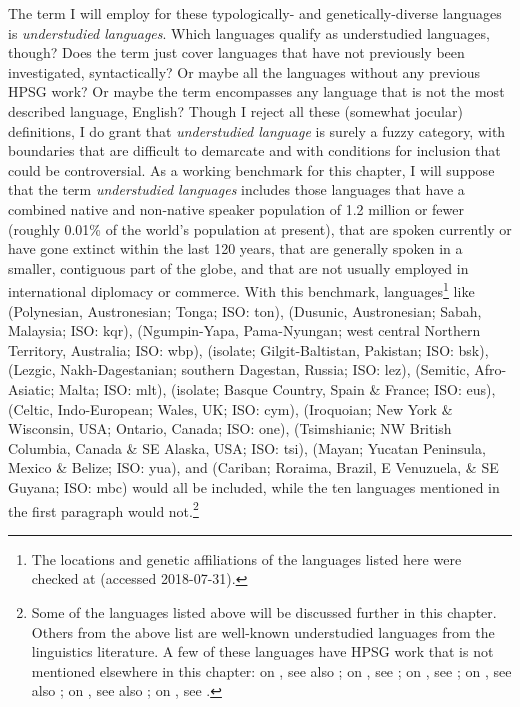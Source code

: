 \documentclass[output=paper]{langsci/langscibook}
\begin{document}
{The term I will employ for these typologically- and genetically-diverse languages is \emph{understudied languages}. Which languages qualify as understudied languages, though? Does the term just cover languages that have not previously been investigated, syntactically? Or maybe all the languages without any previous HPSG work? Or maybe the term encompasses any language that is not the most described language, English? Though I reject all these (somewhat jocular) definitions, I do grant that \textit{understudied language} is surely a fuzzy category, with boundaries that are difficult to demarcate and with conditions for inclusion that could be controversial. As a working benchmark for this chapter, I will suppose that the term \textit{understudied languages} includes those languages that have a combined native and non-native speaker population of 1.2 million or fewer (roughly 0.01\% of the world's population at present), that are spoken currently or have gone extinct within the last 120 years, that are generally spoken in a smaller, contiguous part of the globe, and that are not usually employed in international diplomacy or commerce. With this benchmark, languages\footnote{The locations and genetic affiliations of the languages listed here were checked at \citealt{glottolog18} (accessed 2018-07-31).} like
 (Polynesian, Austronesian; Tonga; ISO: ton), 
 (Dusunic, Austronesian; Sabah, Malaysia; ISO: kqr),
 (Ngumpin-Yapa, Pama-Nyungan; west central Northern Territory, Australia; ISO: wbp), 
 (isolate; Gilgit-Baltistan, Pakistan; ISO: bsk), 
 (Lezgic, Nakh-Dagestanian; southern Dagestan, Russia; ISO: lez), 
 (Semitic, Afro-Asiatic; Malta; ISO: mlt), 
 (isolate; Basque Country, Spain \& France; ISO: eus),  
 (Celtic, Indo-European; Wales, UK; ISO: cym), 
 (Iroquoian; New York \& Wisconsin, USA; Ontario, Canada; ISO: one), 
 (Tsimshianic; NW British Columbia, Canada \& SE Alaska, USA; ISO: tsi),
 (Mayan; Yucatan Peninsula, Mexico \& Belize; ISO: yua), and
 (Cariban; Roraima, Brazil, E Venuzuela, \& SE Guyana; ISO: mbc)
would all be included, while the ten languages mentioned in the first paragraph would not.\footnote{\label{list expln}Some of the languages listed above will be discussed further in this chapter. Others from the above list are well-known understudied languages from the linguistics literature. A few of these languages have HPSG work that is not mentioned elsewhere in this chapter: on , see also \citealt{dukes2000}; on , see \citealt{donosag99}; on , see \citealt{MuellerMalteseSketch}; on , see also \citealt{CB11}; on , see also \citealt{KM2010a-u}; on , see \citealt{dabkowski17}.}   


}
\end{document}
